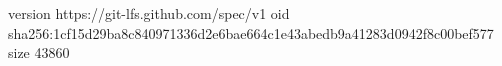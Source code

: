 version https://git-lfs.github.com/spec/v1
oid sha256:1cf15d29ba8c840971336d2e6bae664c1e43abedb9a41283d0942f8c00bef577
size 43860
